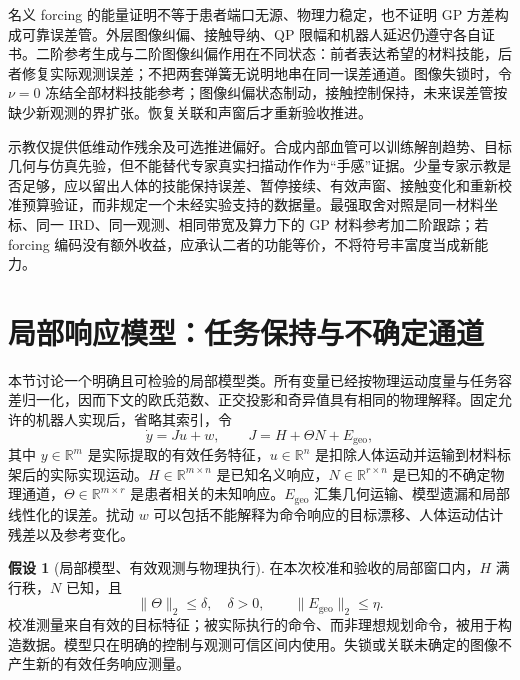 \documentclass[11pt,a4paper]{article}
\numberwithin{equation}{section}
\theoremstyle{definition}
\newtheorem{assumption}[theorem]{假设}
\begin{document}
名义 forcing 的能量证明不等于患者端口无源、物理力稳定，也不证明 GP 方差构成可靠误差管。外层图像纠偏、接触导纳、QP 限幅和机器人延迟仍遵守各自证书。二阶参考生成与二阶图像纠偏作用在不同状态：前者表达希望的材料技能，后者修复实际观测误差；不把两套弹簧无说明地串在同一误差通道。图像失锁时，令 $\nu=0$ 冻结全部材料技能参考；图像纠偏状态制动，接触控制保持，未来误差管按缺少新观测的界扩张。恢复关联和声窗后才重新验收推进。

示教仅提供低维动作残余及可选推进偏好。合成内部血管可以训练解剖趋势、目标几何与仿真先验，但不能替代专家真实扫描动作作为“手感”证据。少量专家示教是否足够，应以留出人体的技能保持误差、暂停接续、有效声窗、接触变化和重新校准预算验证，而非规定一个未经实验支持的数据量。最强取舍对照是同一材料坐标、同一 IRD、同一观测、相同带宽及算力下的 GP 材料参考加二阶跟踪；若 forcing 编码没有额外收益，应承认二者的功能等价，不将符号丰富度当成新能力。

\section{局部响应模型：任务保持与不确定通道}
\label{sec:cal-local}

本节讨论一个明确且可检验的局部模型类。所有变量已经按物理运动度量与任务容差归一化，因而下文的欧氏范数、正交投影和奇异值具有相同的物理解释。固定允许的机器人实现后，省略其索引，令
\begin{equation}
  \dot y=Ju+w,\qquad
  J=H+\Theta N+E_{\mathrm{geo}},
  \label{eq:cal-model}
\end{equation}
其中 $y\in\mathbb R^m$ 是实际提取的有效任务特征，$u\in\mathbb R^n$ 是扣除人体运动并运输到材料标架后的实际实现运动。$H\in\mathbb R^{m\times n}$ 是已知名义响应，$N\in\mathbb R^{r\times n}$ 是已知的不确定物理通道，$\Theta\in\mathbb R^{m\times r}$ 是患者相关的未知响应。$E_{\mathrm{geo}}$ 汇集几何运输、模型遗漏和局部线性化的误差。扰动 $w$ 可以包括不能解释为命令响应的目标漂移、人体运动估计残差以及参考变化。

\begin{assumption}[局部模型、有效观测与物理执行]
\label{ass:cal-model}
在本次校准和验收的局部窗口内，$H$ 满行秩，$N$ 已知，且
\begin{equation}
  \|\Theta\|_2\le\delta,\quad\delta>0,\qquad
  \|E_{\mathrm{geo}}\|_2\le\eta .
\end{equation}
校准测量来自有效的目标特征；被实际执行的命令、而非理想规划命令，被用于构造数据。模型只在明确的控制与观测可信区间内使用。失锁或关联未确定的图像不产生新的有效任务响应测量。
\end{assumption}
\end{document}
